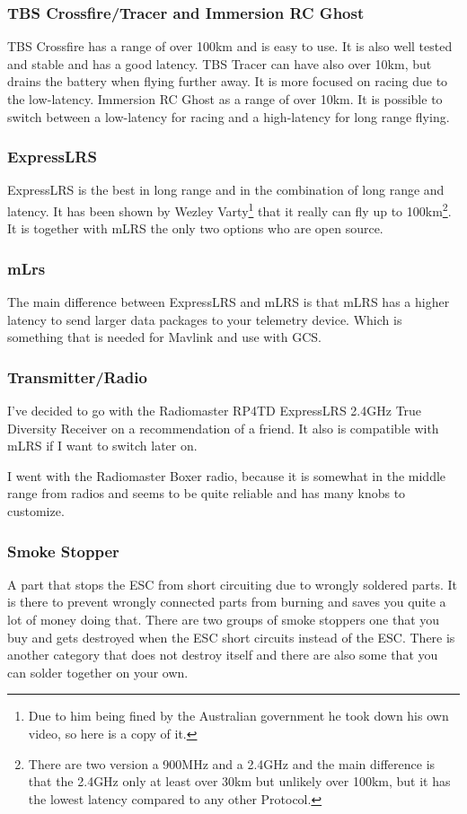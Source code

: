 \documentclass{article}
\begin{document}
	\subsubsection*{TBS Crossfire/Tracer and Immersion RC Ghost}
	TBS Crossfire has a range of over 100km and is easy to use. It is also well tested and stable and has a good latency. 
	TBS Tracer can have also over 10km, but drains the battery when flying further away. It is more focused on racing due to the low-latency.
	Immersion RC Ghost as a range of over 10km. It is possible to switch between a low-latency for racing and a high-latency for long range flying. 
	\subsubsection*{ExpressLRS}
	ExpressLRS is the best in long range and in the combination of long range and latency. It has been shown by Wezley Varty\cite{elrswezley}\footnote{Due to him being fined by the Australian government he took down his own video, so here is a copy of it.} that it really can fly up to 100km\footnote{There are two version a 900MHz and a 2.4GHz and the main difference is that the 2.4GHz only at least over 30km but unlikely over 100km, but it has the lowest latency compared to any other Protocol.}. It is together with mLRS the only two options who are open source.
	\subsubsection*{mLrs}
	The main difference between ExpressLRS and mLRS is that mLRS has a higher latency to send larger data packages to your telemetry device. Which is something that is needed for Mavlink and use with GCS. 
	
	\subsubsection*{Transmitter/Radio}
	I've decided to go with the Radiomaster RP4TD ExpressLRS 2.4GHz True Diversity Receiver\cite{radiomasterreceiver} on a recommendation of a friend. It also is compatible with mLRS if I want to switch later on.
	
	I went with the Radiomaster Boxer\cite{radiomasterboxer} radio, because it is somewhat in the middle range from radios and seems to be quite reliable and has many knobs to customize. 

	\subsubsection{Smoke Stopper}
	A part that stops the ESC from short circuiting due to wrongly soldered parts. It is there to prevent wrongly connected parts from burning and saves you quite a lot of money doing that. There are two groups of smoke stoppers one that you buy and gets destroyed when the ESC short circuits instead of the ESC. There is another category that does not destroy itself and there are also some that you can solder together on your own\cite{smokestopper}. 
	
\end{document}
